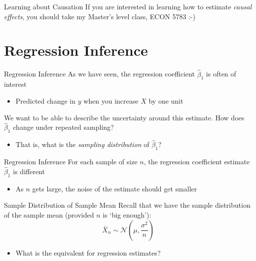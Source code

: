 \documentclass[aspectratio=169,t,11pt,table]{beamer}
\begin{document}
\begin{frame}{Learning about Causation}
  If you are interested in learning how to estimate \emph{causal effects}, you should take my Master's level class, ECON 5783 :-) 
\end{frame}


\section{Regression Inference}

\begin{frame}{Regression Inference}
  As we have seen, the regression coefficient $\hat{\beta}_1$ is often of interest
  \begin{itemize}
    \item Predicted change in $y$ when you increase $X$ by one unit
  \end{itemize}

  \pause
  \bigskip
  We want to be able to describe the uncertainty around this estimate. How does $\hat{\beta}_1$ change under repeated sampling?
  \begin{itemize}
    \item That is, what is the \emph{sampling distribution} of $\hat{\beta}_1$?
  \end{itemize}
\end{frame}


\begin{frame}{Regression Inference}
  For each sample of size $n$, the regression coefficient estimate $\hat{\beta}_1$ is different
  \begin{itemize}
    \item As $n$ gets large, the noise of the estimate should get smaller
  \end{itemize}
\end{frame}

\begin{frame}{Sample Distribution of Sample Mean}
  Recall that we have the sample distribution of the sample mean (provided $n$ is `big enough'):
  $$
    \bar{X}_n \sim \mathcal{N}(\mu, \frac{\sigma^2}{n})
  $$
  \begin{itemize}
    \item What is the equivalent for regression estimates?
  \end{itemize}
\end{frame}
\end{document}
